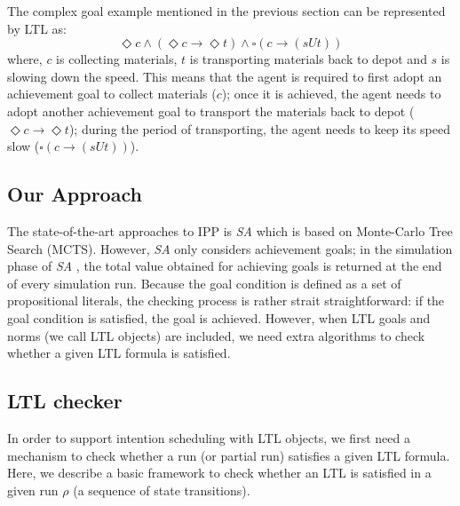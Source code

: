 \documentclass{article}
\newcommand{\SA}{\emph{SA} \hspace{1pt}}
\begin{document}
The complex goal example mentioned in the previous section can be represented by LTL as:
$$\Diamond c \land (\Diamond c \rightarrow \Diamond t) \land \square (c \rightarrow (s{U} t))$$
where, $c$ is collecting materials, $t$ is transporting materials back to depot and $s$ is slowing down the speed. This means that the agent is required to first adopt an achievement goal to collect materials ($c$); once it is achieved, the agent needs to adopt another achievement goal to transport the materials back to depot ($\Diamond c \rightarrow \Diamond t$); during the period of transporting, the agent needs to keep its speed slow ($\square (c \rightarrow (s{U} t))$).

\subsection*{Our Approach}
The state-of-the-art approaches to IPP is \SA which is based on Monte-Carlo Tree Search (MCTS). However, \SA only considers achievement goals; in the simulation phase of \SA, the total value obtained for achieving goals is returned at the end of every simulation run. Because the goal condition is defined as a set of propositional literals, the checking process is rather strait straightforward: if the goal condition is satisfied, the goal is achieved. However, when LTL goals and norms (we call LTL objects) are included, we need extra algorithms to check whether a given LTL formula is satisfied.

\subsection*{LTL checker}
In order to support intention scheduling with LTL objects, we first need a mechanism to check whether a run (or partial run) satisfies a given LTL formula.
%
Here, we describe a basic framework to check whether an LTL is satisfied in a given run $\rho$ (a sequence of state transitions).
\end{document}
